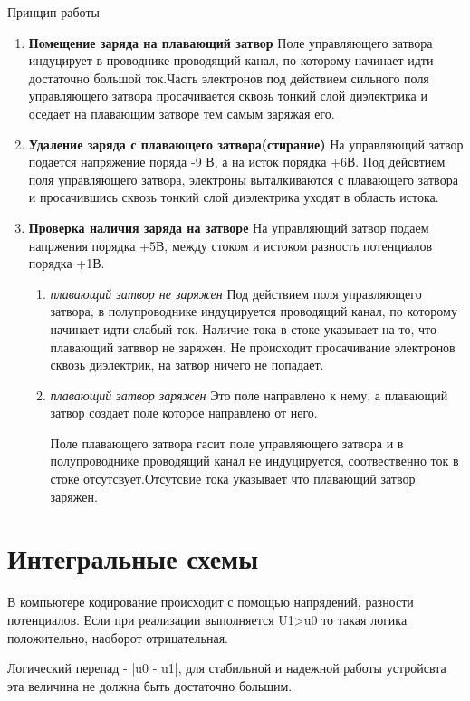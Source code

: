 \documentclass[../main.tex]{subfiles}
\begin{document}
Принцип работы 
\begin{enumerate}
    \item \textbf{Помещение заряда на плавающий затвор}
    Поле управляющего затвора индуцирует в проводнике проводящий канал, по которому начинает идти достаточно большой ток.Часть электронов под действием сильного поля управляющего затвора
    просачивается сквозь тонкий слой диэлектрика и оседает на плавающим затворе тем самым заряжая его. 
    \item \textbf{Удаление заряда с плавающего затвора(стирание)}
    На управляющий затвор подается напряжение поряда -9 В, а на исток порядка +6В. Под дейсвтием поля управляющего затвора, электроны выталкиваются с плавающего затвора и просачившись
    сквозь тонкий слой диэлектрика уходят в область истока. 
    \item \textbf{Проверка наличия заряда на затворе}
    На управляющий затвор подаем напржения порядка +5В, между стоком и истоком разность потенциалов порядка +1В.
    \begin{enumerate}
        \item \textit{плавающий затвор не заряжен}
        Под действием поля управляющего затвора, в полупроводнике индуцируется проводящий канал, по которому начинает идти слабый ток. Наличие тока в стоке указывает на то, что
        плавающий затввор не заряжен. Не происходит просачивание электронов сквозь диэлектрик, на затвор ничего не попадает.
        \item \textit{плавающий затвор заряжен}
        Это поле направлено к нему, а плавающий затвор создает поле которое направлено от него.

        Поле плавающего затвора гасит поле управляющего затвора и в полупроводнике проводящий канал не индуцируется, соотвественно ток в стоке отсутсвует.Отсутсвие тока указывает
        что плавающий затвор заряжен.
    \end{enumerate}
\end{enumerate}

\section{Интегральные схемы}

В компьютере кодирование происходит с помощью напрядений, разности потенциалов. Если при реализации выполняется U1>u0 то  такая логика положительно, наоборот отрицательная.

Логический перепад - |u0 - u1|, для стабильной и надежной работы устройсвта эта величина не должна быть достаточно большим.
\end{document}
